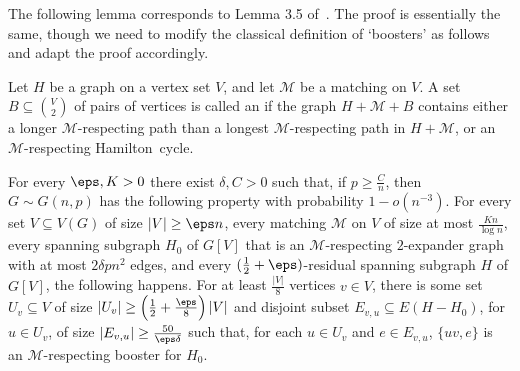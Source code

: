 \documentclass[10pt,a4paper,reqno]{amsart}
\begin{document}
The following lemma corresponds to Lemma 3.5 of~\cite{Montgomery2019resilient}. The proof is essentially the same, though we need to modify the classical definition of `boosters' as follows and adapt the proof accordingly.
\begin{definition}
Let $H$ be a graph on a vertex set $V$, and let $\mathcal{M}$ be a matching on $V$. A set $B \subseteq \binom{V}{2}$ of pairs of vertices is called an  if the graph $H + \mathcal{M} + B$ contains either a longer $\mathcal{M}$-respecting path than a longest $\mathcal{M}$-respecting path in $H + \mathcal{M}$, or an $\mathcal{M}$-respecting Hamilton~cycle.
\end{definition}
\begin{lemma}
  \label{lem:find-linear-v-linear-u-many-e-boost}
  For every $ \eps, K > 0$ there exist $\delta, C > 0$ such that, if $p \geq \frac{C}{n}$, then $G \sim G(n, p)$ has the following property with probability $1 - o(n^{-3})$. For every set $V \subseteq V(G)$ of size $|V| \geq \eps n$, every matching $\mathcal{M}$ on $V$ of size at most $\frac{K n}{\log{n}}$, every spanning subgraph $H_0$ of $G[V]$ that is an $\mathcal{M}$-respecting $2$-expander graph with at most $2\delta p n^2$ edges, and every $(\frac{1}{2} + \eps)$-residual spanning subgraph $H$ of $G[V]$, the following happens. For at least $\frac{|V|}{8}$ vertices $v \in V$, there is some set $U_v \subseteq V$ of size $|U_v| \geq \left(\frac{1}{2} + \frac{\eps}{8}\right)|V|$ and disjoint subset  $E_{v, u} \subseteq E(H - H_0)$, for $u\in U_v$, of size $|E_{v, u}| \geq \frac{50}{\eps \delta}$ such that, for each $u \in U_v$ and $e \in E_{v, u}$, $\{uv, e\}$ is an $\mathcal{M}$-respecting booster for $H_0$.
\end{lemma}
\end{document}
